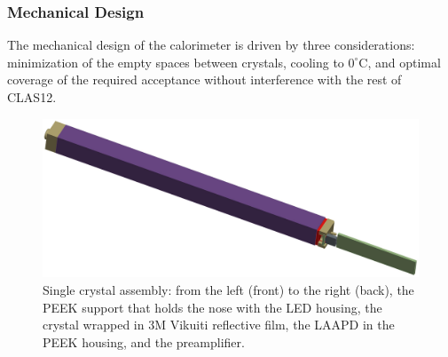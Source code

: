 \subsubsection{Mechanical Design}
The mechanical design of the calorimeter is
driven by three considerations: minimization of the empty spaces between
crystals, cooling to $0^\circ$C, and optimal coverage of the required acceptance without interference with the rest
of CLAS12.
\begin{figure}[th!]
\centering 
\includegraphics[width=1.0\columnwidth]{./fig/sc-assembly.eps}
\caption{Single crystal assembly: from the
left (front) to the right (back), the PEEK support that holds the nose with the LED housing, the
crystal wrapped in 3M Vikuiti reflective film, the LAAPD in the PEEK housing, and
the  preamplifier.}
\label{fig:crystalassembly} 
\end{figure}

